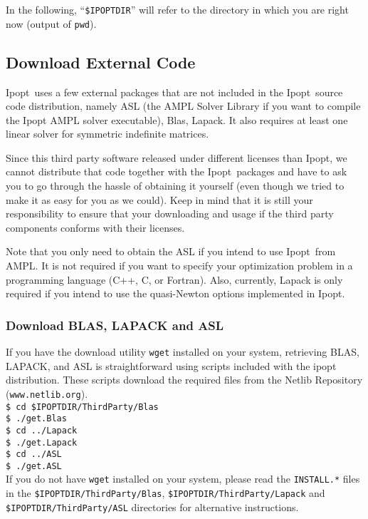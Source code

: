 \documentclass[10pt]{article}
\newcommand{\Ipopt}{{\sc Ipopt}}
\begin{document}
In the following, ``\texttt{\$IPOPTDIR}'' will refer to the directory in
which you are right now (output of \texttt{pwd}).

\subsection{Download External Code}\label{ExternalCode}
\Ipopt\ uses a few external packages that are not included in the
\Ipopt\ source code distribution, namely ASL (the AMPL Solver Library
if you want to compile the Ipopt AMPL solver executable), Blas,
Lapack.  It also requires at least one linear solver for symmetric
indefinite matrices.

Since this third party software released under different licenses than
\Ipopt, we cannot distribute that code together with the \Ipopt\
packages and have to ask you to go through the hassle of obtaining it
yourself (even though we tried to make it as easy for you as we
could).  Keep in mind that it is still your responsibility to ensure
that your downloading and usage if the third party components conforms
with their licenses.

Note that you only need to obtain the ASL if you intend to use \Ipopt\
from AMPL.  It is not required if you want to specify your
optimization problem in a programming language (C++, C, or Fortran).
Also, currently, Lapack is only required if you intend to use the
quasi-Newton options implemented in \Ipopt.

\subsubsection{Download BLAS, LAPACK and ASL}
If you have the download utility \texttt{wget} installed on your
system, retrieving BLAS, LAPACK, and ASL is straightforward using
scripts included with the ipopt distribution. These scripts download
the required files from the Netlib Repository
(\texttt{www.netlib.org}).\\

\noindent
{\tt \$ cd \$IPOPTDIR/ThirdParty/Blas}\\
{\tt \$ ./get.Blas}\\
{\tt \$ cd ../Lapack}\\
{\tt \$ ./get.Lapack}\\
{\tt \$ cd ../ASL}\\
{\tt \$ ./get.ASL}\\

\noindent
If you do not have \texttt{wget} installed on your system, please read
the \texttt{INSTALL.*} files in the
\texttt{\$IPOPTDIR/ThirdParty/Blas},
\texttt{\$IPOPTDIR/ThirdParty/Lapack} and
\texttt{\$IPOPTDIR/ThirdParty/ASL} directories for alternative
instructions.
\end{document}
